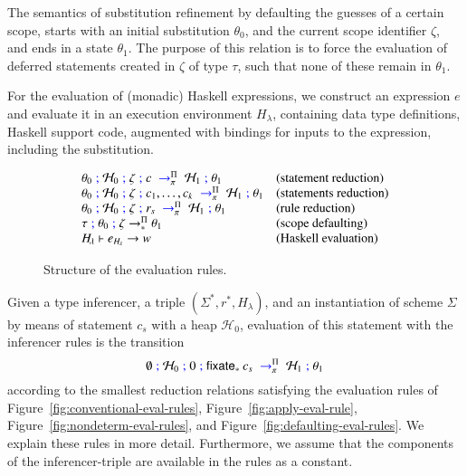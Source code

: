 \documentclass[preprint,natbib]{sigplanconf}
\newcommand\Rule{r}
\newcommand\Rules{\Rule^*}
\newcommand\Statement{c}
\newcommand\Scheme{\Sigma}
\newcommand\Schemes{\Scheme^*}
\newcommand\SchemeName{s}
\newcommand\Type{\tau}
\newcommand\Haskell{H_{\!\lambda}}
\newcommand\Fixate{\mathsf{fixate}}
\newcommand\Heap{\mathcal{H}}
\newcommand\Substitution{\theta}
\newcommand\Scope{\zeta}
\newcommand\Deriv{\pi}
\newcommand\DerivsEnv{\Pi}
\newcommand\attrsep{\;\textcolor{blue}{;}\;}
\newcommand\transition[2]{\;\;\textcolor{blue}{\rightarrow}^{#1}_{#2}\;\;}
\begin{document}
    The semantics of substitution refinement by defaulting the guesses of a certain scope, starts with an initial substitution
    $\Substitution_0$, and the current scope identifier $\Scope$, and ends in a state $\Substitution_1$. The purpose of this relation is to
    force the evaluation of deferred statements created in $\Scope$ of type $\Type$, such that none of these remain in $\Substitution_1$.
    
    For the evaluation of (monadic) Haskell expressions, we construct an expression $e$ and evaluate it in an execution environment
    $\Haskell$, containing data type definitions, Haskell support code, augmented with bindings for inputs to the expression, including
    the substitution.
    
    \begin{figure}[htp]
    \begin{displaymath}
      \begin{array}[t]{ll}
      \Substitution_0  \attrsep  \Heap_0  \attrsep  \Scope  \attrsep  \Statement  \transition{\DerivsEnv}{\Deriv}  \Heap_1 \attrsep \Substitution_1    & (\mbox{statement reduction}) \\
      \Substitution_0  \attrsep  \Heap_0  \attrsep  \Scope  \attrsep  \Statement_1,\ldots,\Statement_k  \transition{\DerivsEnv}{\Deriv}  \Heap_1 \attrsep \Substitution_1    & (\mbox{statements reduction}) \\
      \Substitution_0  \attrsep  \Heap_0  \attrsep  \Scope  \attrsep  \Rule_{\SchemeName}  \transition{\DerivsEnv}{\Deriv}  \Heap_1 \attrsep \Substitution_1    & (\mbox{rule reduction}) \\
      \Type \attrsep \Substitution_0 \attrsep \Scope \rightarrow^{\DerivsEnv}_{*} \Substitution_1       & (\mbox{scope defaulting}) \\
      \Haskell \vdash e_{\Haskell} \rightarrow w   &  \mbox{(Haskell evaluation)} \\
      \end{array}
    \end{displaymath}
    \caption{Structure of the evaluation rules.}
    \label{fig:eval-syntax}
    \end{figure}

    Given a type inferencer, a triple $(\Schemes,\Rules,\Haskell)$, and an instantiation of scheme $\Scheme$ by means of statement
    $\Statement_{\SchemeName}$ with a heap $\Heap_0$, evaluation of this statement with the inferencer rules is the transition
    \begin{displaymath}
      \emptyset \attrsep \Heap_0 \attrsep 0 \attrsep \Fixate_{*} \: \Statement_{\SchemeName} \transition{\DerivsEnv}{\Deriv}  \Heap_1 \attrsep \Substitution_1
    \end{displaymath}
    according to the smallest reduction relations satisfying the evaluation rules of Figure~\ref{fig:conventional-eval-rules},
    Figure~\ref{fig:apply-eval-rule}, Figure~\ref{fig:nondeterm-eval-rules}, and Figure~\ref{fig:defaulting-eval-rules}. We explain
    these rules in more detail. Furthermore, we assume that the components of the inferencer-triple are available in the rules as a constant.
\end{document}
